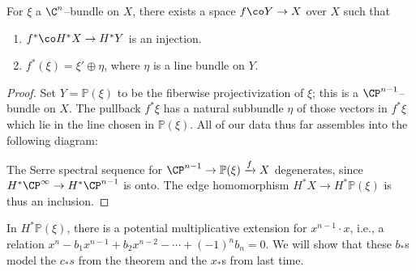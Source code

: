 \begin{subappendices}
\begin{lemma}
For $\xi$ a $\C^n$--bundle on $X$, there exists a space $f\co Y \to X$ over $X$ such that
\begin{enumerate}
    \item $f^*\co H^* X \to H^* Y$ is an injection.
    \item $f^*(\xi) = \xi' \oplus \eta$, where $\eta$ is a line bundle on $Y$.
\end{enumerate}
\end{lemma}
\begin{proof}
Set $Y = \mathbb P(\xi)$ to be the fiberwise projectivization of $\xi$; this is a $\CP^{n-1}$--bundle on $X$.  The pullback $f^* \xi$ has a natural subbundle $\eta$ of those vectors in $f^* \xi$ which lie in the line chosen in $\mathbb P(\xi)$.  All of our data thus far assembles into the following diagram:
\begin{center}
\end{center}
The Serre spectral sequence for $\CP^{n-1} \to \mathbb P(\xi) \xrightarrow f X$ degenerates, since $H^* \CP^\infty \to H^* \CP^{n-1}$ is onto.  The edge homomorphism $H^* X \to H^* \mathbb P(\xi)$ is thus an inclusion.
\end{proof}

\begin{remark}
In $H^* \mathbb P(\xi)$, there is a potential multiplicative extension for $x^{n-1} \cdot x$, i.e., a relation $x^n - b_1 x^{n-1} + b_2 x^{n-2} - \cdots + (-1)^n b_n = 0$.  We will show that these $b_*$s model the $c_*s$ from the theorem and the $x_*$s from last time.
\end{remark}


\end{subappendices}
